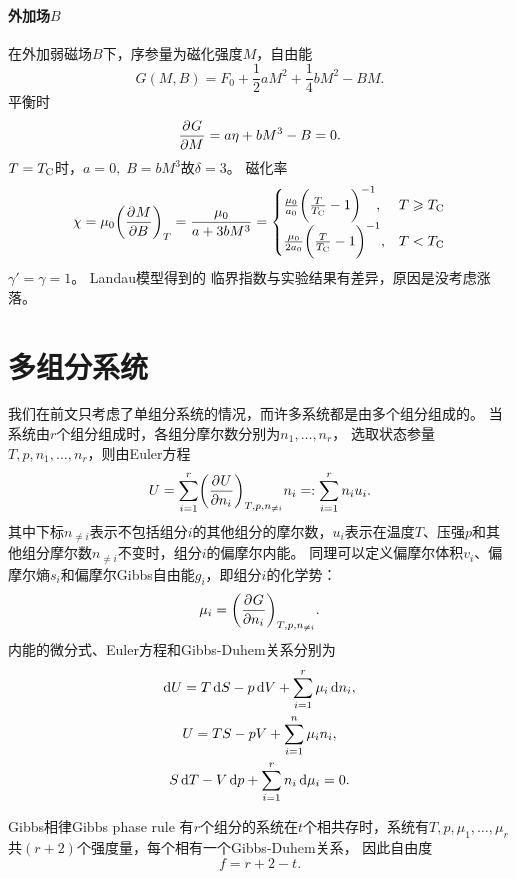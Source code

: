 \paragraph{外加场$B$}
在外加弱磁场$B$下，序参量为磁化强度$M$，自由能
\[
	G(M,B)=F_0+\frac12aM^2+\frac14bM^2-BM.
\]
平衡时
\[
	\pv GM=a\eta+bM^3-B=0.
\]
$T=T_\crt$时，$a=0,\;B=bM^3$故$\delta=3$。
磁化率
\[
	\chi=\mu_0\pu[T]MB=\frac{\mu_0}{a+3bM^3}=
	\begin{cases}
		\frac{\mu_0}{a_0}\biggkh{\frac T{T_\crt}-1}^{-1},&T\geqslant T_\crt \\
		\frac{\mu_0}{2a_0}\biggkh{\frac T{T_\crt}-1}^{-1}, & T<T_\crt
	\end{cases}
\]
$\gamma'=\gamma=1$。
Landau模型得到的
临界指数与实验结果有差异，原因是没考虑涨落。

\section{多组分系统}

我们在前文只考虑了单组分系统的情况，而许多系统都是由多个组分组成的。
当系统由$r$个组分组成时，各组分摩尔数分别为$n_1,\ldots,n_r$，
选取状态参量$T,p,n_1,\ldots,n_r$，则由Euler方程
\begin{equation}
	U=\sum_{i=1}^r\pu[T,p,n_{\neq i}]U{n_i}n_i=:\sum_{i=1}^rn_iu_i.
\end{equation}
其中下标$n_{\neq i}$表示不包括组分$i$的其他组分的摩尔数，$u_i$表示在温度$T$、压强$p$和其他组分摩尔数$n_{\neq i}$不变时，组分$i$的偏摩尔内能。
同理可以定义偏摩尔体积$v_i$、偏摩尔熵$s_i$和偏摩尔Gibbs自由能$g_i$，即组分$i$的化学势：
\begin{equation}
	\mu_i=\pu[T,p,n_{\neq i}]G{n_i}.
\end{equation}
内能的微分式、Euler方程和Gibbs-Duhem关系分别为
\begin{subequations}
	\begin{gather}
		\d U=T\d S-p\d V+\sum_{i=1}^r\mu_i\d n_i,\\
		U=TS-pV+\sum_{i=1}^n\mu_in_i,\\
		S\d T-V\d p+\sum_{i=1}^rn_i\d\mu_i=0.
	\end{gather}
\end{subequations}

\begin{theorem}
	{Gibbs相律}{Gibbs phase rule}
	有$r$个组分的系统在$t$个相共存时，系统有$T,p,\mu_1,\ldots,\mu_r$共$(r+2)$个强度量，每个相有一个Gibbs-Duhem关系，
	因此自由度
	\begin{equation}
		f=r+2-t.
	\end{equation}
\end{theorem}

